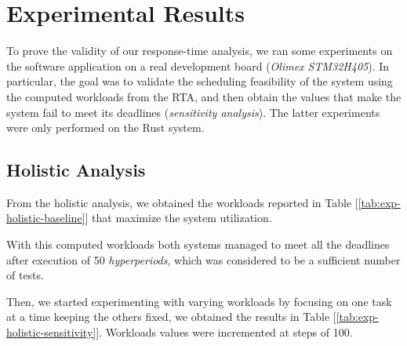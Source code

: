 \section{Experimental Results}

To prove the validity of our response-time analysis, we ran some
experiments on the software application on a real development board
(\textit{Olimex STM32\-H405}). In particular, the goal was to validate the
scheduling feasibility of the system using the computed workloads from the RTA,
and then obtain the values that make the system fail to meet its deadlines
(\textit{sensitivity analysis}). The latter experiments were only performed on
the Rust system. 

\subsection{Holistic Analysis}

From the holistic analysis, we obtained the workloads reported in Table
[\ref{tab:exp-holistic-baseline}] that maximize the system utilization. 
\begin{table}
  \centering
  \caption{Holistic baseline workloads (board experiments)}
  \label{tab:exp-holistic-baseline}
\end{table}
With this computed workloads both systems managed to meet all the deadlines
after execution of 50 \textit{hyperperiods}, which was considered to be a
sufficient number of tests.  

Then, we started experimenting with varying workloads by focusing on one task at
a time keeping the others fixed, we obtained the results in Table
[\ref{tab:exp-holistic-sensitivity}]. Workloads values were incremented at steps
of 100. 

